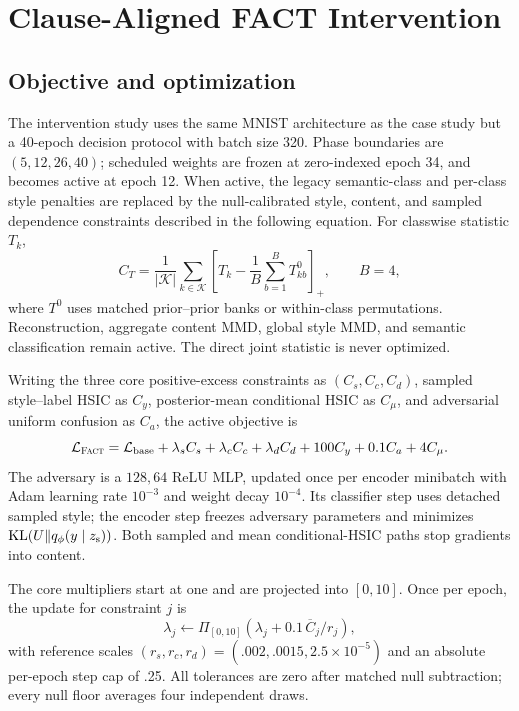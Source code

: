 \section{Clause-Aligned FACT Intervention}
\label{app:fact}

\subsection{Objective and optimization}

The intervention study uses the same MNIST architecture as the case study but a
40-epoch decision protocol with batch size 320.  Phase boundaries are
$(5,12,26,40)$; scheduled weights are frozen at zero-indexed epoch 34, and
\FACT{} becomes active at epoch 12.  When active, the legacy semantic-class
and per-class style penalties are replaced by the null-calibrated style,
content, and sampled dependence constraints described in
the following equation.  For classwise statistic $T_k$,
\begin{equation}
C_T=\frac1{|\mathcal K|}\sum_{k\in\mathcal K}
\left[T_k-\frac1B\sum_{b=1}^{B}T^0_{kb}\right]_+,\qquad B=4,
\label{eq:fact-null}
\end{equation}
where $T^0$ uses matched prior--prior banks or within-class permutations.
Reconstruction, aggregate content MMD, global style MMD, and semantic
classification remain active.  The direct joint statistic is never optimized.

Writing the three core positive-excess constraints as
$(C_s,C_c,C_d)$, sampled style--label HSIC as $C_y$, posterior-mean
conditional HSIC as $C_\mu$, and adversarial uniform confusion as $C_a$, the
active objective is
\begin{equation}
\mathcal L_{\textsc{Fact}}=\mathcal L_{\mathrm{base}}
+\lambda_s C_s+\lambda_c C_c+\lambda_d C_d
+100C_y+0.1C_a+4C_\mu .
\end{equation}
The adversary is a $128,64$ ReLU MLP, updated once per encoder minibatch with
Adam learning rate $10^{-3}$ and weight decay $10^{-4}$.  Its classifier step
uses detached sampled style; the encoder step freezes adversary parameters and
minimizes $\mathrm{KL}(U\|q_\phi(y\mid z_{\mathrm{s}}))$.  Both sampled and mean conditional-HSIC
paths stop gradients into content.

The core multipliers start at one and are projected into $[0,10]$.  Once per
epoch, the update for constraint $j$ is
\begin{equation}
\lambda_j\leftarrow\Pi_{[0,10]}\left(
\lambda_j+0.1\,\overline C_j/r_j\right),
\end{equation}
with reference scales $(r_s,r_c,r_d)=(.002,.0015,2.5\!\times\!10^{-5})$ and
an absolute per-epoch step cap of .25.  All tolerances are zero after matched
null subtraction; every null floor averages four independent draws.


